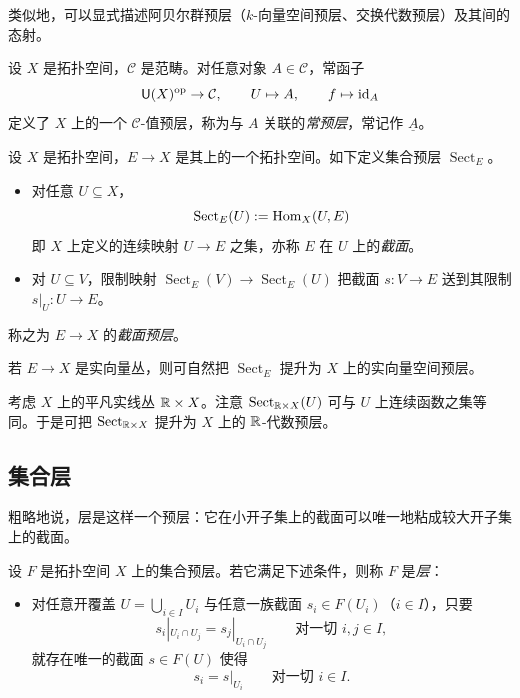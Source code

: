 类似地，可以显式描述阿贝尔群预层（$k$-向量空间预层、交换代数预层）及其间的态射。

\begin{example}\label{ex:1.1.3}
设 $X$ 是拓扑空间，$\mathcal C$ 是范畴。对任意对象 $A\in\mathcal C$，常函子
\[
\mathsf{U}(X)^{\mathrm{op}}\to\mathcal C,\qquad U\mapsto A,\qquad f\mapsto \operatorname{id}_A
\]
定义了 $X$ 上的一个 $\mathcal C$-值预层，称为与 $A$ 关联的\emph{常预层}，常记作 $\underline{A}$。
\end{example}

\begin{example}\label{ex:1.1.4}
设 $X$ 是拓扑空间，$E\to X$ 是其上的一个拓扑空间。如下定义集合预层 $\operatorname{Sect}_E$。
\begin{itemize}
  \item 对任意 $U\subseteq X$，
  \[
  \operatorname{Sect}_E(U):=\operatorname{Hom}_X(U,E)
  \]
  即 $X$ 上定义的连续映射 $U\to E$ 之集，亦称 $E$ 在 $U$ 上的\emph{截面}。
  \item 对 $U\subseteq V$，限制映射 $\operatorname{Sect}_E(V)\to\operatorname{Sect}_E(U)$ 把截面 $s\colon V\to E$ 送到其限制 $s|_U\colon U\to E$。
\end{itemize}
称之为 $E\to X$ 的\emph{截面预层}。
\end{example}

\begin{example}\label{ex:1.1.5}
若 $E\to X$ 是实向量丛，则可自然把 $\operatorname{Sect}_E$ 提升为 $X$ 上的实向量空间预层。
\end{example}

\begin{example}\label{ex:1.1.6}
考虑 $X$ 上的平凡实线丛 $\mathbb{R}\times X$。注意 $\operatorname{Sect}_{\mathbb{R}\times X}(U)$ 可与 $U$ 上连续函数之集等同。于是可把 $\operatorname{Sect}_{\mathbb{R}\times X}$ 提升为 $X$ 上的 $\mathbb{R}$-代数预层。
\end{example}

\subsection{集合层}\label{sec:1.2}

粗略地说，层是这样一个预层：它在小开子集上的截面可以唯一地粘成较大开子集上的截面。

\begin{definition}\label{def:1.2.1}
设 $F$ 是拓扑空间 $X$ 上的集合预层。若它满足下述条件，则称 $F$ 是\emph{层}：
\begin{itemize}
  \item[$(*)$] 对任意开覆盖 $U=\bigcup_{i\in I}U_i$ 与任意一族截面 $s_i\in F(U_i)$（$i\in I$），只要
  \[
  s_i|_{U_i\cap U_j}=s_j|_{U_i\cap U_j}\qquad\text{对一切 } i,j\in I,
  \]
  就存在唯一的截面 $s\in F(U)$ 使得
  \[
  s_i=s|_{U_i}\qquad\text{对一切 } i\in I.
  \]
\end{itemize}
\end{definition}

